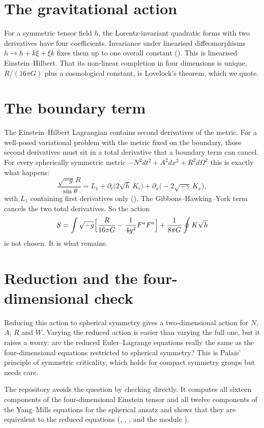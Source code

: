 \section{The gravitational action}

For a symmetric tensor field $h$, the Lorentz-invariant quadratic forms with two derivatives have four coefficients. Invariance under linearised diffeomorphisms $h\to h+k\xi+\xi k$ fixes them up to one overall constant (). This is linearised Einstein--Hilbert. That its non-linear completion in four dimensions is unique, $R/(16\pi G)$ plus a cosmological constant, is Lovelock's theorem, which we quote. \external

\section{The boundary term}

The Einstein--Hilbert Lagrangian contains second derivatives of the metric. For a well-posed variational problem with the metric fixed on the boundary, those second derivatives must sit in a total derivative that a boundary term can cancel. For every spherically symmetric metric $-N^2dt^2+A^2dx^2+R^2d\Omega^2$ this is exactly what happens:
\[
\frac{\sqrt{-g}\,R}{\sin\theta}=L_1+\partial_t\bigl(2\sqrt h\,K_t\bigr)+\partial_x\bigl(-2\sqrt{-\gamma}\,K_x\bigr),
\]
with $L_1$ containing first derivatives only (). The Gibbons--Hawking--York term cancels the two total derivatives. So the action
\[
S=\int\sqrt{-g}\Bigl[\frac{R}{16\pi G}-\frac1{4g^2}F^aF^a\Bigr]+\frac1{8\pi G}\oint K\sqrt h
\]
is not chosen. It is what remains.

\section{Reduction and the four-dimensional check}

Reducing this action to spherical symmetry gives a two-dimensional action for $N$, $A$, $R$ and $W$. Varying the reduced action is easier than varying the full one, but it raises a worry: are the reduced Euler--Lagrange equations really the same as the four-dimensional equations restricted to spherical symmetry? This is Palais' principle of symmetric criticality, which holds for compact symmetry groups but needs care.

The repository avoids the question by checking directly. It computes all sixteen components of the four-dimensional Einstein tensor and all twelve components of the Yang--Mills equations for the spherical ansatz and shows that they are equivalent to the reduced equations (, , , and the module ).

